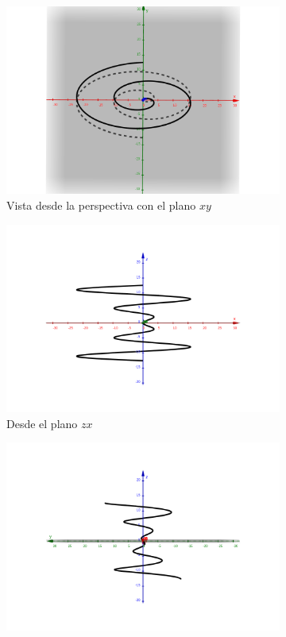 \documentclass[letterpaper]{article}
\renewcommand{\*}{\cdot}
\theoremstyle{definition}
\begin{document}
\begin{figure}[h!]
	\centering
	\begin{subfigure}[b]{0.3\linewidth}
	\includegraphics[width=\textwidth]{img/Proyecto4_7.png}
	\caption{Vista desde la perspectiva con el plano $ xy $}
\end{subfigure}
\begin{subfigure}[b]{0.3\linewidth}
	\includegraphics[width=\textwidth]{img/Proyecto4_8.png}
	\caption{Desde el plano $ zx $}
\end{subfigure}
\begin{subfigure}[b]{0.3\linewidth}
	\includegraphics[width=\textwidth]{img/Proyecto4_9.png}

\end{subfigure}
\end{figure}
\end{document}
